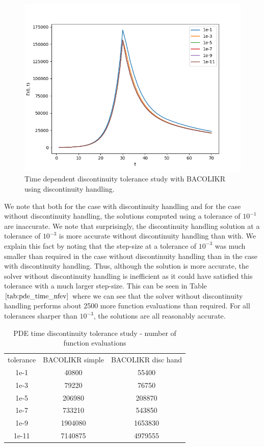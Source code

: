 \documentclass{article}
\begin{document}
\begin{figure}[H]
\centering
\includegraphics[width=0.7\linewidth]{./figures/pde_time_disc_bacolikr_disc_hand_tol}
\caption{Time dependent discontinuity tolerance study with BACOLIKR using discontinuity handling.}
\label{fig:pde_time_disc_bacolikr_disc_hand_tol}
\end{figure}

We note that both for the case with discontinuity handling and for the case without discontinuity handling, the solutions computed using a tolerance of $10^{-1}$ are inaccurate. We note that surprisingly, the discontinuity handling solution at a tolerance of $10^{-3}$ is more accurate without discontinuity handling than with. We explain this fact by noting that the step-size at a tolerance of $10^{-3}$ was much smaller than required in the case without discontinuity handling than in the case with discontinuity handling. Thus, although the solution is more accurate, the solver without discontinuity handling is inefficient as it could have satisfied this tolerance with a much larger step-size. This can be seen in Table $\ref{tab:pde_time_nfev}$ where we can see that the solver without discontinuity handling performs about 2500 more function evaluations than required. For all tolerances sharper than $10^{-3}$, the solutions are all reasonably accurate.

\begin{table}[h]
\caption {PDE time discontinuity tolerance study - number of function evaluations} 
\label{tab:pde_time_nfev}
\begin{center}
\begin{tabular}{ c c c } 
tolerance & BACOLIKR simple  & BACOLIKR disc hand \\ 
1e-1      &   40800         &   55400 \\
1e-3      &   79220         &   76750 \\
1e-5      &  206980         &  208870 \\
1e-7      &  733210         &  543850 \\
1e-9      & 1904080         & 1653830 \\
1e-11     & 7140875         & 4979555 \\
\end{tabular}
\end{center}
\end{table}
\end{document}
